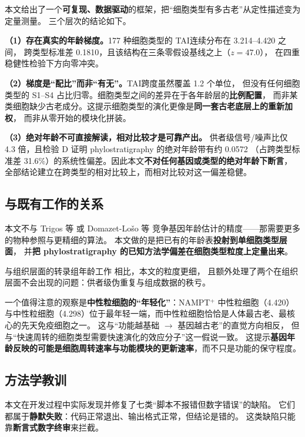 \documentclass[UTF8, a4paper, 11pt]{ctexart}
\newcommand{\tai}{\textsc{TAI}}
\begin{document}
本文给出了一个\textbf{可复现、数据驱动}的框架，把“细胞类型有多古老”从定性描述变为定量测量。
三个层次的结论如下。

\textbf{（1）存在真实的年龄梯度。}177 种细胞类型的 \tai 连续分布在 3.214--4.420 之间，
跨类型标准差 0.1810，且该结构在三条零假设基线之上（$z = 47.0$），
在四重稳健性检验下方向零冲突。

\textbf{（2）梯度是“配比”而非“有无”。}\tai 跨度虽然覆盖 1.2 个单位，
但没有任何细胞类型的 S1--S4 占比归零。细胞类型之间的差异在于各年龄层的\textbf{比例配置}，
而非某类细胞缺少古老成分。这提示细胞类型的演化更像是\textbf{同一套古老底层上的重新加权}，
而非从零开始的模块化拼装。

\textbf{（3）绝对年龄不可直接解读，相对比较才是可靠产出。}
供者级信号/噪声比仅 4.3 倍，且检验 D 证明 phylostratigraphy 的绝对年龄带有约 0.0572
（占跨类型标准差 31.6\%）的系统性偏差。因此本文\textbf{不对任何基因或类型的绝对年龄下断言}，
全部结论建立在跨类型的相对比较上，而相对比较对这一偏差稳健。

\subsection{与既有工作的关系}

本文不与 Trigos 等\citep{trigos2017} 或 Domazet-Lo\v{s}o 等\citep{domazetloso2017}
竞争基因年龄估计的精度——那需要更多的物种参照与更精细的算法。
本文做的是把已有的年龄表\textbf{投射到单细胞类型层面}，
并\textbf{把 phylostratigraphy 的已知方法学偏差在细胞类型粒度上定量出来}。

与组织层面的转录组年龄工作\citep{lu2017} 相比，本文的粒度更细，
且额外处理了两个在组织层面不会出现的问题：供者级伪重复与组成数据的秩亏。

一个值得注意的观察是\textbf{中性粒细胞的“年轻化”}：NAMPT$^{+}$ 中性粒细胞（4.420）
与中性粒细胞（4.298）位于最年轻一端，而中性粒细胞恰恰是人体最古老、最核心的先天免疫细胞之一。
这与“功能越基础 $\to$ 基因越古老”的直觉方向相反，
但与“快速周转的细胞类型需要快速演化的效应分子”这一假说一致。
这提示\textbf{基因年龄反映的可能是细胞周转速率与功能模块的更新速率}，而不只是功能的保守程度。

\subsection{方法学教训}

本文在开发过程中实际发现并修复了七类“脚本不报错但数字错误”的缺陷。
它们都属于\textbf{静默失败}：代码正常退出、输出格式正常，但结论是错的。
这类缺陷只能靠\textbf{断言式数字终审}来拦截。
\end{document}
